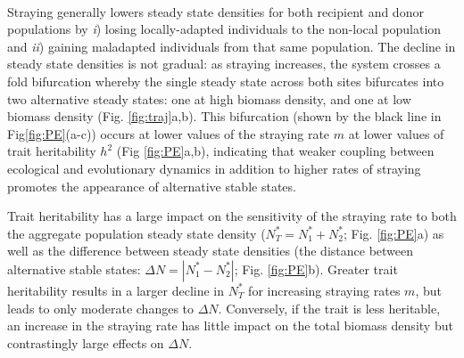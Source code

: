 \documentclass[twocolumn,preprintnumbers,amsmath,amssymb,superscriptaddress]{revtex4}
\begin{document}




 \\
\noindent Straying generally lowers steady state densities for both recipient and donor populations by \emph{i}) losing locally-adapted individuals to the non-local population and \emph{ii}) gaining maladapted individuals from that same population. %
The decline in steady state densities is not gradual: as straying increases, the system crosses a fold bifurcation whereby the single steady state across both sites bifurcates into two alternative steady states: one at high biomass density, and one at low biomass density (Fig. \ref{fig:traj}a,b).
This bifurcation  (shown by the black line in Fig\ref{fig:PE}(a-c)) occurs at lower values of the straying rate $m$ at lower values of trait heritability $h^2$ (Fig \ref{fig:PE}a,b), indicating that weaker coupling between ecological and evolutionary dynamics in addition to higher rates of straying promotes the appearance of alternative stable states.

Trait heritability has a large impact on the sensitivity of the straying rate to both the aggregate population steady state density ($N^*_T=N^*_1+N^*_2$; Fig. \ref{fig:PE}a) as well as the difference between steady state densities (the distance between alternative stable states: $\Delta N=|N^*_1-N^*_2|$; Fig. \ref{fig:PE}b).
Greater trait heritability results in a larger decline in $N_T^*$ for increasing straying rates $m$, but leads to only moderate changes to $\Delta N$.
Conversely, if the trait is less heritable, an increase in the straying rate has little impact on the total biomass density but contrastingly large effects on $\Delta N$.
\end{document}
